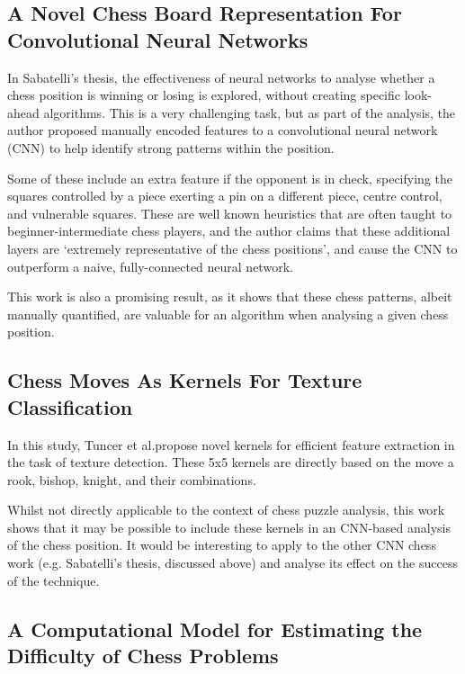 \subsection{A Novel Chess Board Representation For Convolutional Neural Networks}

In Sabatelli's thesis,\cite{chessCNN} the effectiveness of neural networks to
analyse whether a chess position is winning or losing is explored, without
creating specific look-ahead algorithms. This is a very challenging task, but
as part of the analysis, the author proposed manually encoded features to a
convolutional neural network (CNN) to help identify strong patterns within the
position. 

Some of these include an extra feature if the opponent is in check, specifying
the squares controlled by a piece exerting a pin on a different piece, centre
control, and vulnerable squares.\cite{chessCNN} These are well known
heuristics that are often taught to beginner-intermediate chess players, and
the author claims that these additional layers are `extremely representative
of the chess positions', and cause the CNN to outperform a naive,
fully-connected neural network.

This work is also a promising result, as it shows that these chess patterns,
albeit manually quantified, are valuable for an algorithm when analysing a
given chess position.

\subsection{Chess Moves As Kernels For Texture Classification}

In this study, Tuncer et al.\@ propose novel kernels for efficient feature
extraction in the task of texture detection.\cite{chessKernel} These 5x5
kernels are directly based on the move a rook, bishop, knight, and their
combinations. 

Whilst not directly applicable to the context of chess puzzle analysis, this
work shows that it may be possible to include these kernels in an CNN-based
analysis of the chess position. It would be interesting to apply to the other
CNN chess work (e.g. Sabatelli's thesis,\cite{chessCNN} discussed above) and
analyse its effect on the success of the technique.

\subsection{A Computational Model for Estimating the Difficulty of Chess
Problems}

